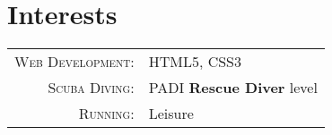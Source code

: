 %
%
%

\section{\texorpdfstring{\color{Blue}Interests}{Interests}}
\begin{tabular}{rl}
    \textsc{Web Development:} & HTML5, CSS3 \\ 
    \textsc{Scuba Diving:} & PADI \textbf{Rescue Diver} level \\ 
    \textsc{Running:} & Leisure \\ 
\end{tabular}
